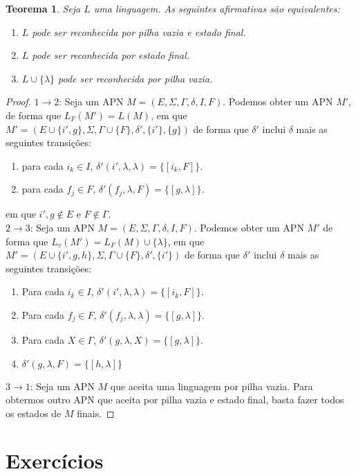 \documentclass[a4paper]{article}
\newtheorem{Theorem}{Teorema}
\theoremstyle{definition}
\begin{document}
  \begin{Theorem}
    Seja $L$ uma linguagem. As seguintes afirmativas são equivalentes:
    \begin{enumerate}
      \item $L$ pode ser reconhecida por pilha vazia e estado final.
      \item $L$ pode ser reconhecida por estado final.
      \item $L\cup\{\lambda\}$ pode ser reconhecida por pilha vazia.
    \end{enumerate}
  \end{Theorem}
  \begin{proof}
    $1 \to 2$: Seja um APN $M = (E,\Sigma,\Gamma,\delta,I,F)$. Podemos
    obter um APN $M'$, de forma que $L_F(M') = L(M)$, em que
    $M'=(E\cup\{i',g\},\Sigma,\Gamma\cup\{F\},\delta',\{i'\},\{g\})$
    de forma que $\delta'$ inclui $\delta$ mais as seguintes transições:
    \begin{enumerate}
        \item para cada $i_k \in I$, $\delta'(i',\lambda,\lambda) =
               \{[i_k,F]\}$.
        \item para cada $f_j \in F$, $\delta'(f_j,\lambda,F)=\{[g,\lambda]\}$.
    \end{enumerate}
    em que $i',g \not\in E$ e $F \not\in \Gamma$.\\
    $2 \to 3$: Seja um APN $M = (E,\Sigma,\Gamma,\delta,I,F)$. Podemos
    obter um APN $M'$ de forma que $L_v(M') = L_F(M) \cup\{\lambda\}$, em que
    $M'=(E\cup\{i',g,h\},\Sigma,\Gamma \cup\{F\},\delta',\{i'\})$ de forma que
    $\delta'$ inclui $\delta$ mais as seguintes transições:
    \begin{enumerate}
      \item Para cada $i_k \in I$, $\delta'(i',\lambda,\lambda)=\{[i_k,F]\}$.
      \item Para cada $f_j \in F$, $\delta'(f_j,\lambda,\lambda)=\{[g,\lambda]\}$.
      \item Para cada $X \in \Gamma$, $\delta'(g,\lambda,X) = \{[g,\lambda]\}$.
      \item $\delta'(g,\lambda,F) = \{[h,\lambda]\}$
    \end{enumerate}
    $3 \to 1$: Seja um APN $M$ que aceita uma linguagem por pilha vazia. Para
    obtermos outro APN que aceita por pilha vazia e estado final, basta fazer
    todos os estados de $M$ finais.
  \end{proof}
  \section{Exercícios} 
\end{document}
